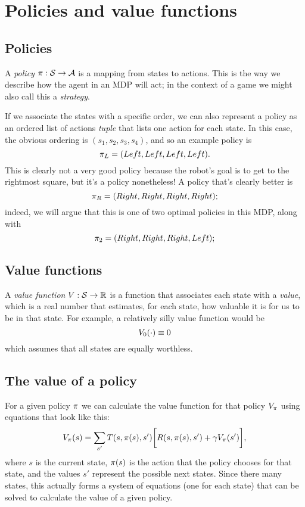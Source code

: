 \documentclass[a4paper]{article}
\begin{document}
\section{Policies and value functions}
\subsection{Policies}
A \emph{policy} $\pi : \mathcal{S} \to \mathcal{A}$ is a mapping from states to
actions.
This is the way we describe how the agent in an MDP will act;
in the context of a game we might also call this a \emph{strategy}.

If we associate the states with a specific order, we can also represent a
policy as an ordered list of actions \emph{tuple} that lists one action
for each state.
In this case, the obvious ordering is $(s_1, s_2, s_3, s_4)$,
and so an example policy is
\begin{equation*}
  \pi_L = (Left, Left, Left, Left) .
\end{equation*}
This is clearly not a very good policy because the robot's goal is to
get to the rightmost square, but it's a policy nonetheless!
A policy that's clearly better is
\begin{equation*}
  \pi_R = (Right, Right, Right, Right) ;
\end{equation*}
indeed, we will argue that this is one of two optimal policies in this MDP,
along with
\begin{equation*}
  \pi_2 = (Right, Right, Right, Left) ;
\end{equation*}

\subsection{Value functions}
A \emph{value function} $V : \mathcal{S} \to \mathbb{R}$ is a function that associates
each state with a \emph{value}, which is a real number that estimates, for
each state, how valuable it is for us to be in that state.
For example, a relatively silly value function would be
\begin{equation*}
  V_0(\cdot) \equiv 0
\end{equation*}
which assumes that all states are equally worthless.

\subsection{The value of a policy}
For a given policy $\pi$ we can calculate the value function for
that policy $V_\pi$ using equations that look like this:
\begin{equation} \label{eq:val}
  V_\pi(s) = \sum_{s'} T(s, \pi(s), s') \bigg[ R(s, \pi(s), s') + \gamma V_\pi(s') \bigg] ,
\end{equation}
where $s$ is the current state, $\pi(s)$ is the action that the policy
chooses for that state, and the values $s'$ represent the possible next states.
Since there many states, this actually forms a system of equations (one for each
state) that can be solved to calculate the value of a given policy.
\end{document}
